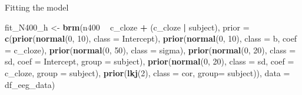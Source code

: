 \documentclass[12pt,ignorenonframetext,aspectratio=169]{beamer}
\newenvironment{Shaded}{\begin{snugshade}}{\end{snugshade}}
\newcommand{\DataTypeTok}[1]{\textcolor[rgb]{0.13,0.29,0.53}{#1}}
\newcommand{\DecValTok}[1]{\textcolor[rgb]{0.00,0.00,0.81}{#1}}
\newcommand{\KeywordTok}[1]{\textcolor[rgb]{0.13,0.29,0.53}{\textbf{#1}}}
\newcommand{\NormalTok}[1]{#1}
\newcommand{\OperatorTok}[1]{\textcolor[rgb]{0.81,0.36,0.00}{\textbf{#1}}}
\newcommand{\StringTok}[1]{\textcolor[rgb]{0.31,0.60,0.02}{#1}}
\begin{document}
\begin{frame}[fragile]{Fitting the model}
\protect\hypertarget{fitting-the-model-1}{}

\scriptsize

\begin{Shaded}
\begin{Highlighting}[]
\NormalTok{fit_N400_h <-}\StringTok{ }\KeywordTok{brm}\NormalTok{(n400 }\OperatorTok{~}\StringTok{ }\NormalTok{c_cloze }\OperatorTok{+}\StringTok{ }\NormalTok{(c_cloze }\OperatorTok{|}\StringTok{ }\NormalTok{subject),}
                  \DataTypeTok{prior =}
                      \KeywordTok{c}\NormalTok{(}\KeywordTok{prior}\NormalTok{(}\KeywordTok{normal}\NormalTok{(}\DecValTok{0}\NormalTok{, }\DecValTok{10}\NormalTok{), }\DataTypeTok{class =}\NormalTok{ Intercept),}
                        \KeywordTok{prior}\NormalTok{(}\KeywordTok{normal}\NormalTok{(}\DecValTok{0}\NormalTok{, }\DecValTok{10}\NormalTok{), }\DataTypeTok{class =}\NormalTok{ b, }\DataTypeTok{coef =}\NormalTok{ c_cloze),}
                        \KeywordTok{prior}\NormalTok{(}\KeywordTok{normal}\NormalTok{(}\DecValTok{0}\NormalTok{, }\DecValTok{50}\NormalTok{), }\DataTypeTok{class =}\NormalTok{ sigma),}
                        \KeywordTok{prior}\NormalTok{(}\KeywordTok{normal}\NormalTok{(}\DecValTok{0}\NormalTok{, }\DecValTok{20}\NormalTok{), }\DataTypeTok{class =}\NormalTok{ sd, }\DataTypeTok{coef =}\NormalTok{ Intercept,}
                              \DataTypeTok{group =}\NormalTok{ subject),}
                        \KeywordTok{prior}\NormalTok{(}\KeywordTok{normal}\NormalTok{(}\DecValTok{0}\NormalTok{, }\DecValTok{20}\NormalTok{), }\DataTypeTok{class =}\NormalTok{ sd, }\DataTypeTok{coef =}\NormalTok{ c_cloze,}
                              \DataTypeTok{group =}\NormalTok{ subject),}
                        \KeywordTok{prior}\NormalTok{(}\KeywordTok{lkj}\NormalTok{(}\DecValTok{2}\NormalTok{), }\DataTypeTok{class =}\NormalTok{ cor,}
                              \DataTypeTok{group=}\NormalTok{ subject)),}
              \DataTypeTok{data =}\NormalTok{ df_eeg_data)}
\end{Highlighting}
\end{Shaded}

\normalsize

\end{frame}
\end{document}
